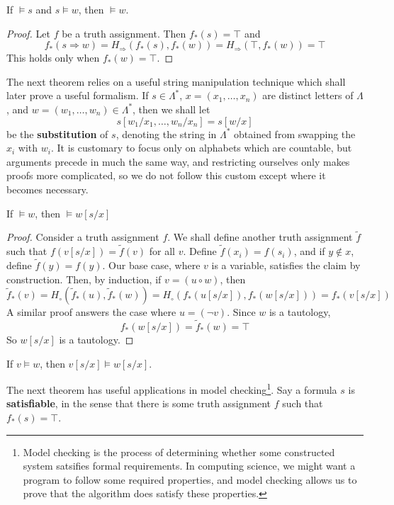 \begin{theorem}
    If $\vDash s$ and $s \vDash w$, then $\vDash w$.
\end{theorem}
\begin{proof}
    Let $f$ be a truth assignment. Then $f_*(s) = \top$ and
    \[ f_*(s \Rightarrow w) = H_\Rightarrow(f_*(s),f_*(w)) = H_\Rightarrow(\top, f_*(w)) = \top \]
    This holds only when $f_*(w) = \top$.
\end{proof}

The next theorem relies on a useful string manipulation technique which shall later prove a useful formalism. If $s \in \Lambda^*$, $x = (x_1, \dots, x_n)$ are distinct letters of $\Lambda$, and $w = (w_1, \dots, w_n) \in \Lambda^*$, then we shall let
%
\[ s[w_1/x_1, \dots, w_n/x_n] = s[w/x] \]
%
be the {\bf substitution} of $s$, denoting the string in $\Lambda^*$ obtained from swapping the $x_i$ with $w_i$. It is customary to focus only on alphabets which are countable, but arguments precede in much the same way, and restricting ourselves only makes proofs more complicated, so we do not follow this custom except where it becomes necessary.

\begin{theorem}
    If $\vDash w$, then $\vDash w[s/x]$
\end{theorem}
\begin{proof}
    Consider a truth assignment $f$. We shall define another truth assignment $\tilde{f}$ such that $f(v[s/x]) = \tilde{f}(v)$ for all $v$. Define $\tilde{f}(x_i) = f(s_i)$, and if $y \not \in x$, define $\tilde{f}(y) = f(y)$. Our base case, where $v$ is a variable, satisfies the claim by construction. Then, by induction, if $v = (u \circ w)$, then
    \[ \tilde{f}_*(v) = H_\circ(\tilde{f}_*(u), \tilde{f}_*(w)) = H_\circ(f_*(u[s/x]), f_*(w[s/x])) = f_*(v[s/x]) \]
    A similar proof answers the case where $u = (\neg v)$. Since $w$ is a tautology,
    \[ f_*(w[s/x]) = \tilde{f}_*(w) = \top \]
    So $w[s/x]$ is a tautology.
\end{proof}

\begin{corollary}
    If $v \vDash w$, then $v[s/x] \vDash w[s/x]$.
\end{corollary}

The next theorem has useful applications in model checking\footnote{Model checking is the process of determining whether some constructed system satsifies formal requirements. In computing science, we might want a program to follow some required properties, and model checking allows us to prove that the algorithm does satisfy these properties.}. Say a formula $s$ is {\bf satisfiable}, in the sense that there is some truth assignment $f$ such that $f_*(s) = \top$.

